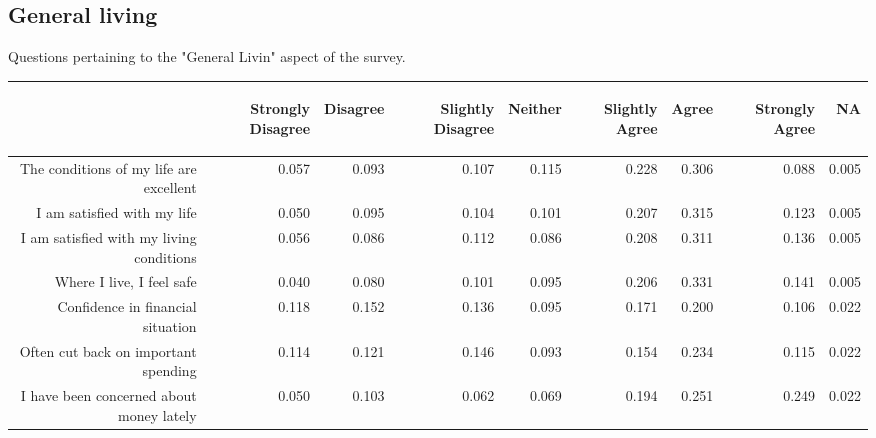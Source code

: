 \documentclass{article}\usepackage[]{graphicx}\usepackage[]{color}
\begin{document}
\subsection{General living}
Questions pertaining to the "General Livin" aspect of the survey.
\begin{table}[ht]
\centering
\begin{tabular}{rrrrrrrrr}
  \hline
 & \begin{sideways} Strongly Disagree \end{sideways} & \begin{sideways} Disagree \end{sideways} & \begin{sideways} Slightly Disagree \end{sideways} & \begin{sideways} Neither \end{sideways} & \begin{sideways} Slightly Agree \end{sideways} & \begin{sideways} Agree \end{sideways} & \begin{sideways} Strongly Agree \end{sideways} & \begin{sideways} NA \end{sideways} \\ 
  \hline
The conditions of my life are excellent & 0.057 & 0.093 & 0.107 & 0.115 & 0.228 & 0.306 & 0.088 & 0.005 \\ 
  I am satisfied with my life & 0.050 & 0.095 & 0.104 & 0.101 & 0.207 & 0.315 & 0.123 & 0.005 \\ 
  I am satisfied with my living conditions & 0.056 & 0.086 & 0.112 & 0.086 & 0.208 & 0.311 & 0.136 & 0.005 \\ 
  Where I live, I feel safe & 0.040 & 0.080 & 0.101 & 0.095 & 0.206 & 0.331 & 0.141 & 0.005 \\ 
  Confidence in financial situation & 0.118 & 0.152 & 0.136 & 0.095 & 0.171 & 0.200 & 0.106 & 0.022 \\ 
  Often cut back on important spending & 0.114 & 0.121 & 0.146 & 0.093 & 0.154 & 0.234 & 0.115 & 0.022 \\ 
  I have been concerned about money lately & 0.050 & 0.103 & 0.062 & 0.069 & 0.194 & 0.251 & 0.249 & 0.022 \\ 
   \hline
\end{tabular}
\end{table}
\end{document}
